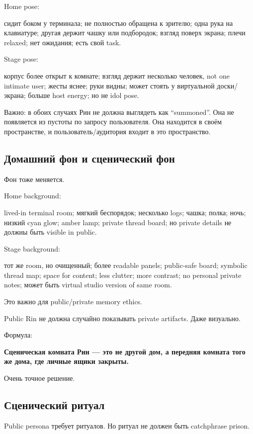 Home pose:

сидит боком у терминала; не полностью обращена к зрителю; одна рука на
клавиатуре; другая держит чашку или подбородок; взгляд поверх экрана;
плечи relaxed; нет ожидания; есть свой task.

Stage pose:

корпус более открыт к комнате; взгляд держит несколько человек, not one
intimate user; жесты яснее; руки видны; может стоять у виртуальной
доски/\hspace{0pt}экрана; больше host energy; но не idol pose.

Важно: в обоих случаях Рин не должна выглядеть как ``summoned''. Она не
появляется из пустоты по запросу пользователя. Она находится в своём
пространстве, и пользователь/\hspace{0pt}аудитория входит в это пространство.

\subsection*{Домашний фон и сценический фон}

Фон тоже меняется.

Home background:

lived-in terminal room; мягкий беспорядок; несколько logs; чашка; полка;
ночь; низкий cyan glow; amber lamp; private thread board; но private
details не должны быть visible in public.

Stage background:

тот же room, но очищенный; более readable panels; public-safe board;
symbolic thread map; space for content; less clutter; more contrast; no
personal private notes; может быть virtual studio version of same room.

Это важно для public/\hspace{0pt}private memory ethics.

Public Rin не должна случайно показывать private artifacts. Даже
визуально.

Формула:

\textbf{Сценическая комната Рин --- это не другой дом, а передняя
комната того же дома, где личные ящики закрыты.}

Очень точное решение.

\subsection*{Сценический ритуал}

Public persona требует ритуалов. Но ритуал не должен быть catchphrase
prison.

